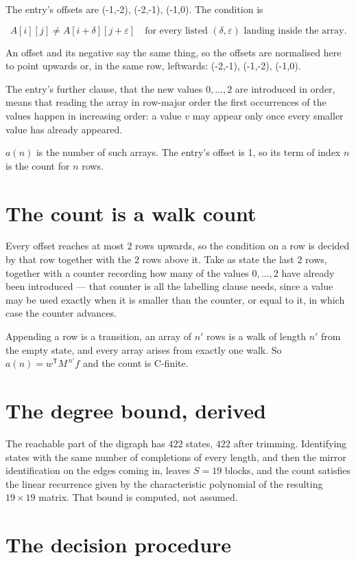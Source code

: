 \documentclass[11pt]{article}
\theoremstyle{definition}
\begin{document}
The entry's offsets are (-1,-2), (-2,-1), (-1,0). The condition is

\[A[i][j] \ne A[i{+}\delta][j{+}\varepsilon]\quad\text{for every listed }(\delta,\varepsilon)\text{ landing inside the array.}\]

An offset and its negative say the same thing, so the offsets are normalised here to point upwards or, in the same row, leftwards: (-2,-1), (-1,-2), (-1,0).

The entry's further clause, that the new values $0,\dots,2$ are introduced in order, means that reading the array in row-major order the first occurrences of the values happen in increasing order: a value $v$ may appear only once every smaller value has already appeared.

$a(n)$ is the number of such arrays. The entry's offset is 1, so its term of index $n$ is the count for $n$ rows.

\section{The count is a walk count}

Every offset reaches at most $2$ rows upwards, so the condition on a row is decided by that row together with the $2$ rows above it. Take as state the last $2$ rows, together with a counter recording how many of the values $0,\dots,2$ have already been introduced --- that counter is all the labelling clause needs, since a value may be used exactly when it is smaller than the counter, or equal to it, in which case the counter advances.

Appending a row is a transition, an array of $n'$ rows is a walk of length $n'$ from the empty state, and every array arises from exactly one walk. So $a(n) = w^{\mathsf T}M^{\,n'}f$ and the count is C-finite.

\section{The degree bound, derived}

The reachable part of the digraph has $422$ states, $422$ after trimming. Identifying states with the same number of completions of every length, and then the mirror identification on the edges coming in, leaves $S = 19$ blocks, and the count satisfies the linear recurrence given by the characteristic polynomial of the resulting $19\times19$ matrix. That bound is computed, not assumed.

\section{The decision procedure}
\end{document}
